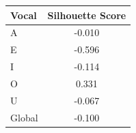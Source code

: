 \begin{tabular}{lc}
\toprule
\rowcolor{col01}
Vocal & Silhouette Score \\
\midrule
A & -0.010 \\
E & -0.596 \\
I & -0.114 \\
O & 0.331 \\
U & -0.067 \\
Global & -0.100 \\
\bottomrule
\end{tabular}
